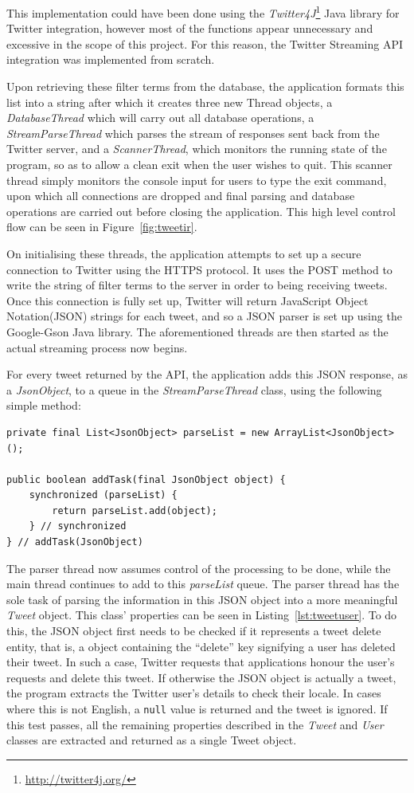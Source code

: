 This implementation could have been done using the \emph{Twitter4J}\footnote{\url{http://twitter4j.org/}} Java library for Twitter integration, however most of the functions appear unnecessary and excessive in the scope of this project. For this reason, the Twitter Streaming API integration was implemented from scratch.

Upon retrieving these filter terms from the database, the application formats this list into a string after which it creates three new Thread objects, a \emph{DatabaseThread} which will carry out all database operations, a \emph{StreamParseThread} which parses the stream of responses sent back from the Twitter server, and a \emph{ScannerThread}, which monitors the running state of the program, so as to allow a clean exit when the user wishes to quit. This scanner thread simply monitors the console input for users to type the exit command, upon which all connections are dropped and final parsing and database operations are carried out before closing the application. This high level control flow can be seen in Figure~\ref{fig:tweetir}.

On initialising these threads, the application attempts to set up a secure connection to Twitter using the HTTPS protocol. It uses the POST method to write the string of filter terms to the server in order to being receiving tweets. Once this connection is fully set up, Twitter will return JavaScript Object Notation(JSON) strings for each tweet, and so a JSON parser is set up using the Google-Gson Java library\cite{gson}. The aforementioned threads are then started as the actual streaming process now begins.

For every tweet returned by the API, the application adds this JSON response, as a \emph{JsonObject}, to a queue in the \emph{StreamParseThread} class, using the following simple method:
\begin{lstlisting}[caption=Adding tweets to a parse queue]
private final List<JsonObject> parseList = new ArrayList<JsonObject>();

public boolean addTask(final JsonObject object) {
    synchronized (parseList) {
        return parseList.add(object);
    } // synchronized
} // addTask(JsonObject)
\end{lstlisting}

The parser thread now assumes control of the processing to be done, while the main thread continues to add to this \emph{parseList} queue. The parser thread has the sole task of parsing the information in this JSON object into a more meaningful \emph{Tweet} object. This class' properties can be seen in Listing~\ref{lst:tweetuser}. To do this, the JSON object first needs to be checked if it represents a tweet delete entity, that is, a object containing the ``delete'' key signifying a user has deleted their tweet. In such a case, Twitter requests that applications honour the user's requests and delete this tweet. If otherwise the JSON object is actually a tweet, the program extracts the Twitter user's details to check their locale. In cases where this is not English, a \texttt{null} value is returned and the tweet is ignored. If this test passes, all the remaining properties described in the \emph{Tweet} and \emph{User} classes are extracted and returned as a single Tweet object.

